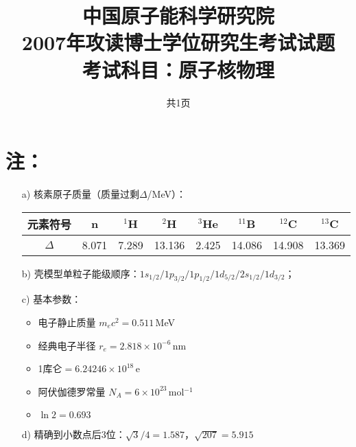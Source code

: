 \documentclass{article}
\title{中国原子能科学研究院\\2007年攻读博士学位研究生考试试题\\考试科目：原子核物理}
\date{共1页}
\begin{document}
\maketitle

\section*{注：}
\begin{itemize}
  \item[a)] 核素原子质量（质量过剩$\Delta$/MeV）：
  \begin{center}
    \begin{tabular}{|c|c|c|c|c|c|c|c|}
      \hline
      元素符号 & n & $^1$H & $^2$H & $^3$He & $^{11}$B & $^{12}$C & $^{13}$C \\
      \hline
      $\Delta$ & 8.071 & 7.289 & 13.136 & 2.425 & 14.086 & 14.908 & 13.369 \\
      \hline
    \end{tabular}
  \end{center}

  \item[b)] 壳模型单粒子能级顺序：$1s_{1/2}/1p_{3/2}/1p_{1/2}/1d_{5/2}/2s_{1/2}/1d_{3/2}$；
  
  \item[c)] 基本参数：
  \begin{itemize}
    \item 电子静止质量 $m_ec^2=0.511$\,MeV
    \item 经典电子半径 $r_e=2.818\times10^{-6}$\,nm
    \item 1库仑$=6.24246\times10^{18}$\,e
    \item 阿伏伽德罗常量 $N_A=6\times10^{23}$\,mol$^{-1}$
    \item $\ln2=0.693$
  \end{itemize}

  \item[d)] 精确到小数点后3位：$\sqrt{3}/4=1.587$，$\sqrt{207}=5.915$
\end{itemize}
\end{document}

